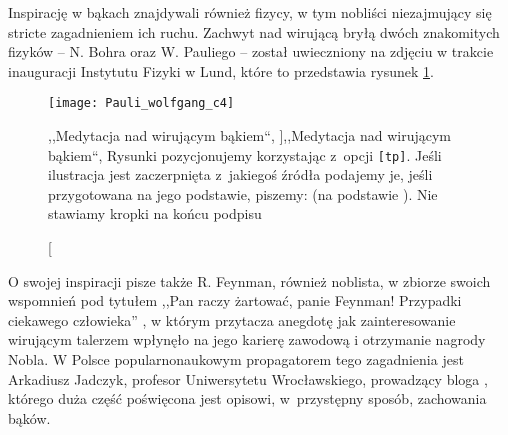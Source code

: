 Inspirację w bąkach znajdywali również fizycy, w tym nobliści niezajmujący się stricte zagadnieniem ich ruchu. Zachwyt nad wirującą bryłą dwóch znakomitych fizyków -- N. Bohra oraz W. Pauliego -- został uwieczniony na zdjęciu w trakcie inauguracji Instytutu Fizyki w Lund, które to przedstawia rysunek \ref{fig:PauliBohr}. 
\begin{figure}[tp]
    \centering
    \texttt{[image: Pauli\_wolfgang\_c4]}
    \caption[,,Medytacja nad wirującym bąkiem``, \cite{PauliBohr}]{,,Medytacja nad wirującym bąkiem``, \cite{PauliBohr} \red Rysunki pozycjonujemy korzystając z~opcji \texttt{[tp]\protect\footnotemark}. Jeśli ilustracja jest zaczerpnięta z~jakiegoś źródła podajemy je, jeśli przygotowana na jego podstawie, piszemy: (na podstawie \cite{PauliBohr}). Nie stawiamy kropki na końcu podpisu}
    \label{fig:PauliBohr}
\end{figure}

O swojej inspiracji pisze także R. Feynman, również noblista, w zbiorze swoich wspomnień pod tytułem ,,\guillemotright{}Pan raczy żartować, panie Feynman!\guillemotleft{} Przypadki ciekawego człowieka'' \cite{feynman2007pan}, w którym przytacza anegdotę jak zainteresowanie wirującym talerzem wpłynęło na jego karierę zawodową i otrzymanie nagrody Nobla. W Polsce popularnonaukowym propagatorem tego zagadnienia jest Arkadiusz Jadczyk, profesor Uniwersytetu Wrocławskiego, prowadzący bloga \cite{Jadczyk}, którego duża część poświęcona jest opisowi, w~przystępny sposób, zachowania bąków.

\noindent
[\ldots]

